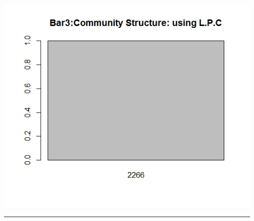 \documentclass{article}
\begin{document}
 \includegraphics[scale=0.4]{p7}\\
 
 \hrule
 
\end{document}

